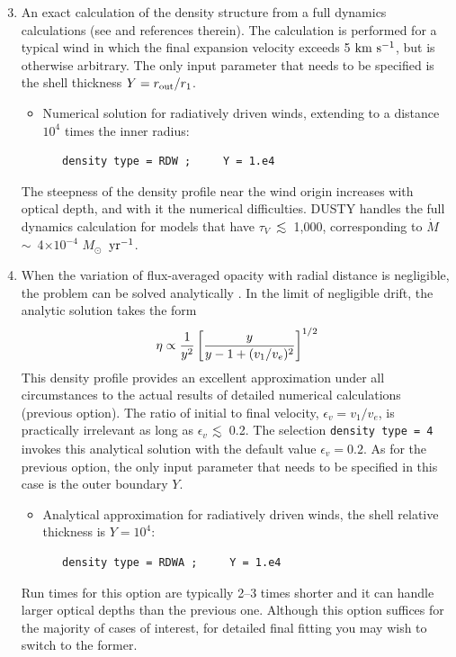 \documentclass[11pt]{article}
\def\E#1{\hbox{$10^{#1}$}}
\def\eq#1{\begin{equation} #1 \end{equation}}
\def\about  {\hbox{$\sim$}}
\def\laa    {\mathrel{\hbox{\raise.3ex\hbox{$<$}\llap
                                {\lower.8ex\hbox{$\sim$}}}}}
\def\la     {\hbox{$\laa$}}
\def\x      {\hbox{$\times$}}
\def\tV     {\hbox{$\tau_V$}}
\def\Mo     {\hbox{$M_{\odot}$}}
\def\Mdot   {\hbox{$\dot{M}$}}
\def\kms    {\hbox{$\rm km\ s^{-1}$}}
\begin{document}
\begin{enumerate}
\setcounter{enumi}{2}
\item
An exact calculation of the density structure from a full dynamics calculations
(see \cite{IE95} and references therein).  The calculation is performed for a
typical wind in which the final expansion velocity exceeds 5 \kms, but is
otherwise arbitrary. The only input parameter that needs to be specified is the
shell thickness $Y = r_{\rm out}/r_1$.

\begin{itemize}
\item
Numerical solution for radiatively driven winds, extending to a distance $10^4$
times the inner radius:

\begin{verbatim}
   density type = RDW ;     Y = 1.e4
\end{verbatim}
\end{itemize}
The steepness of the density profile near the wind origin increases with
optical depth, and with it the numerical difficulties.  DUSTY handles the full
dynamics calculation for models that have \tV\ \la\ 1,000, corresponding to
\Mdot\ \about\ 4\x\E{-4} \Mo\ $\rm yr^{-1}$.

\item
When the variation of flux-averaged opacity with radial distance is negligible,
the problem can be solved analytically \cite{IEprep}.  In the limit of
negligible drift, the analytic solution takes the form
\eq{
    \eta \propto {1\over y^2}\left[{y \over y - 1 + (v_1/v_e)^2}\right]^{1/2}
}
This density profile provides an excellent approximation under all
circumstances to the actual results of detailed numerical calculations
(previous option). The ratio of initial to final velocity, $\epsilon_v =
v_1/v_e$, is practically irrelevant as long as $\epsilon_v$ \la\ 0.2. The
selection {\tt density type = 4} invokes this analytical solution with the
default value $\epsilon_v = 0.2$. As for the previous option, the only input
parameter that needs to be specified in this case is the outer boundary $Y$.

\begin{itemize}
\item
Analytical approximation for radiatively driven winds, the shell relative
thickness is $Y = 10^4$:

\begin{verbatim}
   density type = RDWA ;     Y = 1.e4
\end{verbatim}
\end{itemize}
Run times for this option are typically 2--3 times shorter and it can handle
larger optical depths than the previous one. Although this option suffices for
the majority of cases of interest, for detailed final fitting you may wish to
switch to the former.

\end{enumerate}
\end{document}

